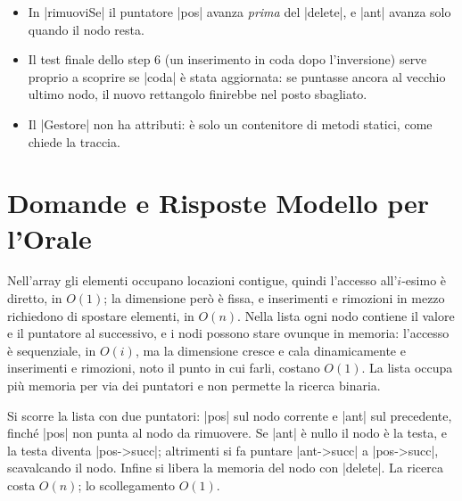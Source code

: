 \begin{consiglio}
\begin{itemize}
  \item In \cc|rimuoviSe| il puntatore \cc|pos| avanza \emph{prima} del \cc|delete|,
        e \cc|ant| avanza solo quando il nodo resta.
  \item Il test finale dello step 6 (un inserimento in coda dopo l'inversione) serve
        proprio a scoprire se \cc|coda| è stata aggiornata: se puntasse ancora al vecchio
        ultimo nodo, il nuovo rettangolo finirebbe nel posto sbagliato.
  \item Il \cc|Gestore| non ha attributi: è solo un contenitore di metodi statici, come
        chiede la traccia.
\end{itemize}
\end{consiglio}

\section{Domande e Risposte Modello per l'Orale}

\begin{orale}
Nell'array gli elementi occupano locazioni contigue, quindi l'accesso all'$i$-esimo è
diretto, in $O(1)$; la dimensione però è fissa, e inserimenti e rimozioni in mezzo
richiedono di spostare elementi, in $O(n)$. Nella lista ogni nodo contiene il valore e il
puntatore al successivo, e i nodi possono stare ovunque in memoria: l'accesso è
sequenziale, in $O(i)$, ma la dimensione cresce e cala dinamicamente e
inserimenti e rimozioni, noto il punto in cui farli, costano $O(1)$. La lista occupa più
memoria per via dei puntatori e non permette la ricerca binaria.
\end{orale}

\begin{orale}
Si scorre la lista con due puntatori: \cc|pos| sul nodo corrente e \cc|ant| sul
precedente, finché \cc|pos| non punta al nodo da rimuovere. Se \cc|ant| è nullo il nodo
è la testa, e la testa diventa \cc|pos->succ|; altrimenti si fa puntare \cc|ant->succ| a
\cc|pos->succ|, scavalcando il nodo. Infine si libera la memoria del nodo con
\cc|delete|. La ricerca costa $O(n)$; lo scollegamento $O(1)$.
\end{orale}

